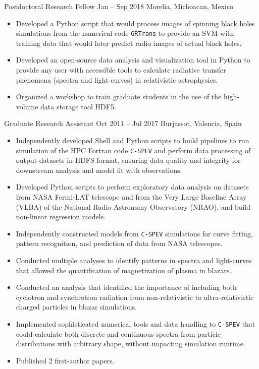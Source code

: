 \cventry{}%
{\UMSNHes}%
{Postdoctoral Research Fellow}%
{Jan -- Sep 2018}%
{Morelia, Michoacan, Mexico}%
{%
\begin{itemize}
    \item Developed a Python script that would process images of spinning black holes simulations from  the numerical code \texttt{GRTrans} to provide an SVM with training data that would later predict radio images of actual black holes.
    \item Developed an open-source data analysis and visualization tool in Python to provide any user with accessible tools to calculate radiative transfer phenomena (spectra and light-curves) in relativistic astrophysics.
    \item Organized a workshop to train graduate students in the use of the high-volume data storage tool HDF5.
\end{itemize}
}
\cventry{}%
{\UVval}%
{Graduate Research Assistant}%
{Oct 2011 -- Jul 2017}%
{Burjassot, Valencia, Spain}%
{%
\begin{itemize}
    \item Independently developed Shell and Python scripts to build pipelines to run simulation of the HPC Fortran code \texttt{C-SPEV} and perform data processing of output datasets in HDFS format, ensuring data quality and integrity for downstream analysis and model fit with observations.
    \item Developed Python scripts to perform exploratory data analysis on datasets from NASA Fermi-LAT telescope and from the Very Large Baseline Array (VLBA) of the National Radio Astronomy Observatory (NRAO), and build non-linear regression models.
    \item Independently constructed models from \texttt{C-SPEV} simulations for curve fitting, pattern recognition, and prediction of data from NASA telescopes.
    \item Conducted multiple analyses to identify patterns in spectra and light-curves that allowed the quantification of magnetization of plasma in blazars.
    \item Conducted an analysis that identified the importance of including both cyclotron and synchrotron radiation from non-relativistic to ultra-relativistic charged particles in blazar simulations.
    \item Implemented sophisticated numerical tools and data handling to \texttt{C-SPEV} that could calculate both discrete and continuous spectra from particle distributions with arbitrary shape, without impacting simulation runtime.
    \item Published 2 first-author papers.
\end{itemize}
}
